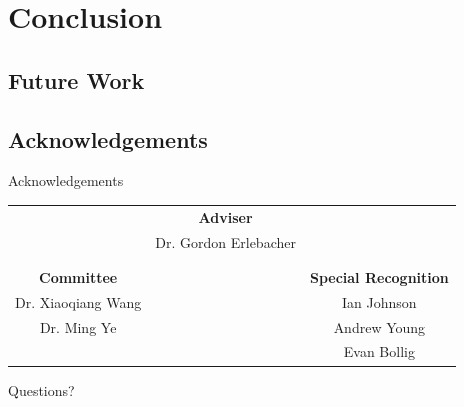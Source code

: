 \documentclass[red]{beamer}
\begin{document}



\section{Conclusion}

\subsection{Future Work}

\subsection{Acknowledgements}

\begin{frame}{Acknowledgements}
	\begin{table}[htdp]
	\begin{center}\begin{tabular}{ccc}
	& \textbf{Adviser} &\\
	& Dr. Gordon Erlebacher&\\
	& &\\
	& &\\
	\textbf{Committee} 		& & \textbf{Special Recognition}\\
	Dr. Xiaoqiang Wang 	& & Ian Johnson\\
	Dr. Ming Ye 			& & Andrew Young\\
	 					& &  Evan Bollig
	\end{tabular} 
	\end{center}
	\end{table}
\end{frame}

\begin{frame}
	\begin{center}
	Questions?
	\end{center}
\end{frame}
\end{document}
